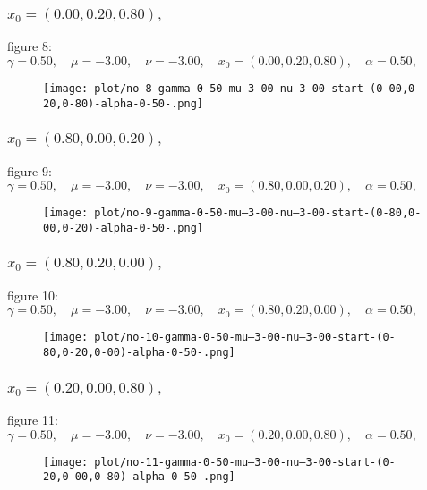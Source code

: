 \documentclass[a4paper]{article}
\begin{document}
\begin{multicols*}{2}
   \subsubsection{\(x_0 = (0.00,0.20,0.80),\quad \)}
   
figure 8: \(\gamma = 0.50,\quad \mu = -3.00,\quad \nu = -3.00,\quad x_0 = (0.00,0.20,0.80),\quad \alpha = 0.50,\quad \)
   \begin{figure}[H]
   \centering
   \texttt{[image: plot/no-8-gamma-0-50-mu--3-00-nu--3-00-start-(0-00,0-20,0-80)-alpha-0-50-.png]}
   \end{figure}
   

   \subsubsection{\(x_0 = (0.80,0.00,0.20),\quad \)}
   
figure 9: \(\gamma = 0.50,\quad \mu = -3.00,\quad \nu = -3.00,\quad x_0 = (0.80,0.00,0.20),\quad \alpha = 0.50,\quad \)
   \begin{figure}[H]
   \centering
   \texttt{[image: plot/no-9-gamma-0-50-mu--3-00-nu--3-00-start-(0-80,0-00,0-20)-alpha-0-50-.png]}
   \end{figure}
   

   \subsubsection{\(x_0 = (0.80,0.20,0.00),\quad \)}
   
figure 10: \(\gamma = 0.50,\quad \mu = -3.00,\quad \nu = -3.00,\quad x_0 = (0.80,0.20,0.00),\quad \alpha = 0.50,\quad \)
   \begin{figure}[H]
   \centering
   \texttt{[image: plot/no-10-gamma-0-50-mu--3-00-nu--3-00-start-(0-80,0-20,0-00)-alpha-0-50-.png]}
   \end{figure}
   

   \subsubsection{\(x_0 = (0.20,0.00,0.80),\quad \)}
   
figure 11: \(\gamma = 0.50,\quad \mu = -3.00,\quad \nu = -3.00,\quad x_0 = (0.20,0.00,0.80),\quad \alpha = 0.50,\quad \)
   \begin{figure}[H]
   \centering
   \texttt{[image: plot/no-11-gamma-0-50-mu--3-00-nu--3-00-start-(0-20,0-00,0-80)-alpha-0-50-.png]}
   \end{figure}
   


\end{multicols*}
\end{document}
